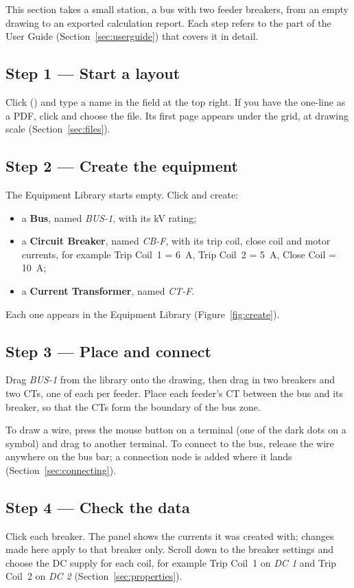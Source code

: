 This section takes a small station, a bus with two feeder breakers, from an empty
drawing to an exported calculation report. Each step refers to the part of the User
Guide (Section~\ref{sec:userguide}) that covers it in detail.

\subsection*{Step 1 --- Start a layout}
Click  () and type a name in the  field at
the top right. If you have the one-line as a PDF, click  and
choose the file. Its first page appears under the grid, at drawing scale
(Section~\ref{sec:files}).

\subsection*{Step 2 --- Create the equipment}
The Equipment Library starts empty. Click  and create:

\begin{itemize}
  \item a \textbf{Bus}, named \emph{BUS-1}, with its kV rating;
  \item a \textbf{Circuit Breaker}, named \emph{CB-F}, with its trip coil, close coil
        and motor currents, for example Trip Coil~1 = \SI{6}{A}, Trip Coil~2 =
        \SI{5}{A}, Close Coil = \SI{10}{A};
  \item a \textbf{Current Transformer}, named \emph{CT-F}.
\end{itemize}

Each one appears in the Equipment Library (Figure~\ref{fig:create}).

\subsection*{Step 3 --- Place and connect}
Drag \emph{BUS-1} from the library onto the drawing, then drag in two breakers and two
CTs, one of each per feeder. Place each feeder's CT between the bus and its breaker, so
that the CTs form the boundary of the bus zone.

To draw a wire, press the mouse button on a terminal (one of the dark dots on a
symbol) and drag to another terminal. To connect to the bus, release the wire
anywhere on the bus bar; a connection node is added where it lands
(Section~\ref{sec:connecting}).

\subsection*{Step 4 --- Check the data}
Click each breaker. The  panel shows the currents it
was created with; changes made here apply to that breaker only. Scroll down to the
breaker settings and choose the DC supply for each coil, for example Trip Coil~1 on
\emph{DC 1} and Trip Coil~2 on \emph{DC 2} (Section~\ref{sec:properties}).

